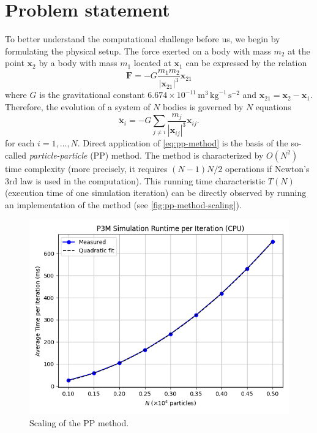 \section{Problem statement}
To better understand the computational challenge before us, we begin by formulating the physical setup.
The force exerted on a body with mass $m_2$ at the point $\mathbf{x}_2$ by a body with mass $m_1$ located at $\mathbf{x}_1$ can be expressed by the relation
\begin{equation}\label{eq:law-of-uni-grav}
    \mathbf{F} = -G\frac{m_1m_2}{|\mathbf{x}_{21}|^3}\mathbf{x}_{21}
\end{equation}
where $G$ is the gravitational constant $6.674\times 10^{-11}\, \mathrm{m}^3 \,\mathrm{kg}^{-1}\,\mathrm{s}^{-2}$ and $\mathbf{x}_{21} = \mathbf{x}_2 - \mathbf{x}_1$.
Therefore, the evolution of a system of $N$ bodies is governed by $N$ equations
\begin{equation}\label{eq:pp-method}
    \ddot{\mathbf{x}}_i = -G\sum_{j\neq i} \frac{m_j}{|\mathbf{x}_{ij}|^3}\mathbf{x}_{ij}.
\end{equation}
for each $i = 1,\dots, N$.
Direct application of \autoref{eq:pp-method} is the basis of the so-called \textit{particle-particle} (PP) method.
The method is characterized by $O(N^2)$ time complexity (more precisely, it requires $(N-1)N/2$ operations if Newton's 3rd law is used in the computation).
This running time characteristic $T(N)$ (execution time of one simulation iteration) can be directly observed by running an implementation of the method (see \autoref{fig:pp-method-scaling}).
\begin{figure}[htp]
    \centering
    \includegraphics[scale=0.5]{chapters/introduction/img/pp_time.png}
    \caption{Scaling of the PP method.}
    \label{fig:pp-method-scaling}
\end{figure}
